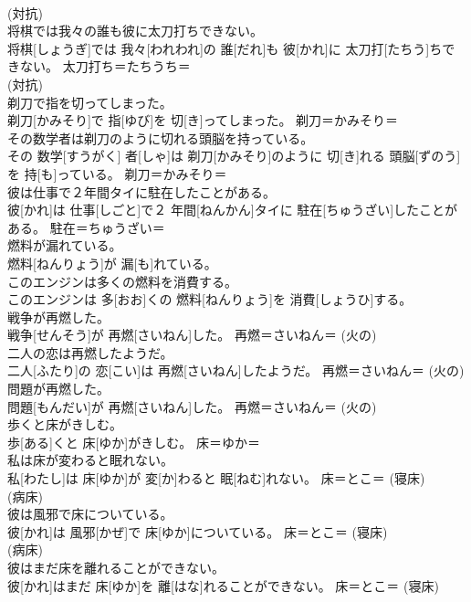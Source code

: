 \documentclass[8pt]{extreport}
\begin{document}
\begin{CJK}{UTF8}{min}
{\\	(対抗) 
\\	将棋では我々の誰も彼に太刀打ちできない。	
\\	将棋[しょうぎ]では 我々[われわれ]の 誰[だれ]も 彼[かれ]に 太刀打[たちう]ちできない。	太刀打ち＝たちうち＝ 
\\	(対抗) 
\\	剃刀で指を切ってしまった。	
\\	剃刀[かみそり]で 指[ゆび]を 切[き]ってしまった。	剃刀＝かみそり＝ 
\\	その数学者は剃刀のように切れる頭脳を持っている。	
\\	その 数学[すうがく] 者[しゃ]は 剃刀[かみそり]のように 切[き]れる 頭脳[ずのう]を 持[も]っている。	剃刀＝かみそり＝ 
\\	彼は仕事で２年間タイに駐在したことがある。	
\\	彼[かれ]は 仕事[しごと]で２ 年間[ねんかん]タイに 駐在[ちゅうざい]したことがある。	駐在＝ちゅうざい＝ 
\\	燃料が漏れている。	
\\	燃料[ねんりょう]が 漏[も]れている。	
\\	このエンジンは多くの燃料を消費する。	
\\	このエンジンは 多[おお]くの 燃料[ねんりょう]を 消費[しょうひ]する。	
\\	戦争が再燃した。	
\\	戦争[せんそう]が 再燃[さいねん]した。	再燃＝さいねん＝ (火の) 
\\	二人の恋は再燃したようだ。	
\\	二人[ふたり]の 恋[こい]は 再燃[さいねん]したようだ。	再燃＝さいねん＝ (火の) 
\\	問題が再燃した。	
\\	問題[もんだい]が 再燃[さいねん]した。	再燃＝さいねん＝ (火の) 
\\	歩くと床がきしむ。	
\\	歩[ある]くと 床[ゆか]がきしむ。	床＝ゆか＝ 
\\	私は床が変わると眠れない。	
\\	私[わたし]は 床[ゆか]が 変[か]わると 眠[ねむ]れない。	床＝とこ＝ (寝床) 
\\	(病床) 
\\	彼は風邪で床についている。	
\\	彼[かれ]は 風邪[かぜ]で 床[ゆか]についている。	床＝とこ＝ (寝床) 
\\	(病床) 
\\	彼はまだ床を離れることができない。	
\\	彼[かれ]はまだ 床[ゆか]を 離[はな]れることができない。	床＝とこ＝ (寝床) 
}
\end{CJK}
\end{document}
